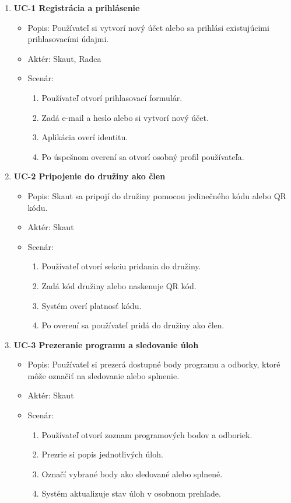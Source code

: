 \begin{enumerate}
    \item \textbf{UC-1 Registrácia a prihlásenie}
    \begin{itemize}
        \item Popis: Používateľ si vytvorí nový účet alebo sa prihlási existujúcimi prihlasovacími údajmi.
        \item Aktér: Skaut, Radca
        \item Scenár:
        \begin{enumerate}
            \item Používateľ otvorí prihlasovací formulár.
            \item Zadá e-mail a heslo alebo si vytvorí nový účet.
            \item Aplikácia overí identitu.
            \item Po úspešnom overení sa otvorí osobný profil používateľa.
        \end{enumerate}
    \end{itemize}

    \item \textbf{UC-2 Pripojenie do družiny ako člen}
    \begin{itemize}
        \item Popis: Skaut sa pripojí do družiny pomocou jedinečného kódu alebo QR kódu.
        \item Aktér: Skaut
        \item Scenár:
        \begin{enumerate}
            \item Používateľ otvorí sekciu pridania do družiny.
            \item Zadá kód družiny alebo naskenuje QR kód.
            \item Systém overí platnosť kódu.
            \item Po overení sa používateľ pridá do družiny ako člen.
        \end{enumerate}
    \end{itemize}

    \item \textbf{UC-3 Prezeranie programu a sledovanie úloh}
    \begin{itemize}
        \item Popis: Používateľ si prezerá dostupné body programu a odborky, ktoré môže označiť na sledovanie alebo splnenie.
        \item Aktér: Skaut
        \item Scenár:
        \begin{enumerate}
            \item Používateľ otvorí zoznam programových bodov a odboriek.
            \item Prezrie si popis jednotlivých úloh.
            \item Označí vybrané body ako sledované alebo splnené.
            \item Systém aktualizuje stav úloh v osobnom prehľade.
        \end{enumerate}
    \end{itemize}


\end{enumerate}
